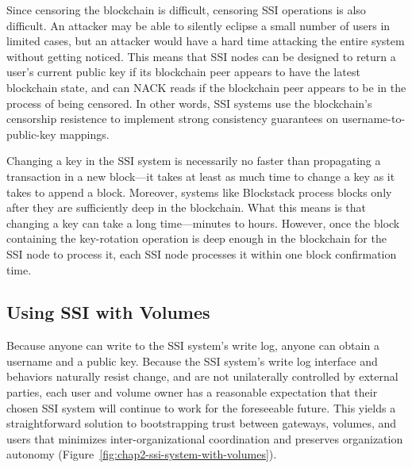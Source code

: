 Since censoring the blockchain is difficult, censoring SSI
operations is also difficult.  An attacker may be able to silently eclipse a small number
of users in limited cases, but an attacker would have a hard time attacking the
entire system without getting noticed.  This means that SSI nodes can be
designed to return a user's current public key if its blockchain peer appears to
have the latest blockchain state, and can NACK reads if the blockchain peer appears to be
in the process of being censored.  In other words, SSI systems use the
blockchain's censorship resistence to implement strong consistency guarantees on
username-to-public-key mappings.

Changing a key in the SSI system is necessarily no faster than propagating a
transaction in a new block---it takes at least as much time to change a key
as it takes to append a block.  Moreover, systems like Blockstack process blocks only after
they are sufficiently deep in the blockchain.  What this means is that changing
a key can take a long time---minutes to hours.  However, once the block
containing the key-rotation operation is deep enough in the blockchain for the
SSI node to process it, each SSI node processes it within one block confirmation
time.

\subsection{Using SSI with Volumes}

Because anyone can write to the SSI system's write log, anyone can obtain a
username and a public key.  Because the SSI system's write log interface and
behaviors naturally resist change, and are not unilaterally controlled by
external parties, each user and volume owner has a reasonable
expectation that their chosen SSI system will continue to work for the
foreseeable future.  This yields a straightforward solution to bootstrapping
trust between gateways, volumes, and users that minimizes inter-organizational
coordination and preserves organization autonomy 
(Figure~\ref{fig:chap2-ssi-system-with-volumes}).

